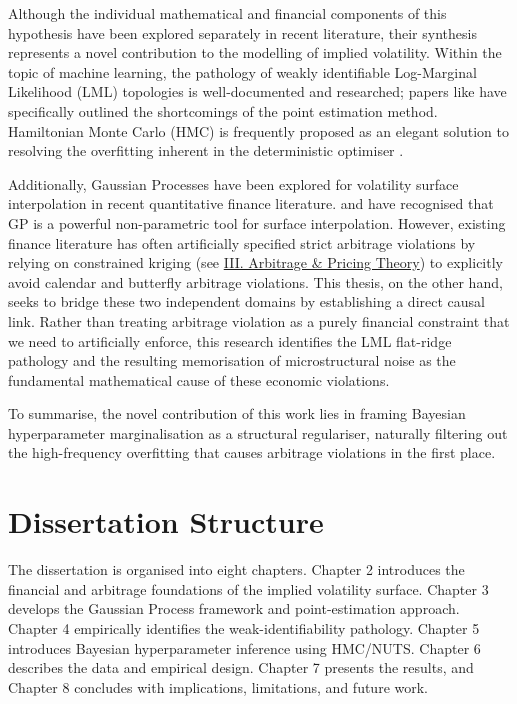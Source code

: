 \documentclass[12pt,oneside]{report}
\theoremstyle{definition}
\theoremstyle{remark}
\begin{document}
Although the individual mathematical and financial components of this hypothesis have been explored separately in recent literature, their synthesis represents a novel contribution to the modelling of implied volatility. Within the topic of machine learning, the pathology of weakly identifiable Log-Marginal Likelihood (LML) topologies is well-documented and researched; papers like \citet{titsias_nd} have specifically outlined the shortcomings of the point estimation method. Hamiltonian Monte Carlo (HMC) is frequently proposed as an elegant solution to resolving the overfitting inherent in the deterministic optimiser \cite{neal2011mcmc}.

Additionally, Gaussian Processes have been explored for volatility surface interpolation in recent quantitative finance literature. \citet{cousin2021gp} and \citet{chataigner2021beyond} have recognised that GP is a powerful non-parametric tool for surface interpolation. However, existing finance literature has often artificially specified strict arbitrage violations by relying on constrained kriging (see \hyperref[sec:glossary_arbitrage_pricing_theory]{III. Arbitrage \& Pricing Theory}) to explicitly avoid calendar and butterfly arbitrage violations. This thesis, on the other hand, seeks to bridge these two independent domains by establishing a direct causal link. Rather than treating arbitrage violation as a purely financial constraint that we need to artificially enforce, this research identifies the LML flat-ridge pathology and the resulting memorisation of microstructural noise as the fundamental mathematical cause of these economic violations.

To summarise, the novel contribution of this work lies in framing Bayesian hyperparameter marginalisation as a structural regulariser, naturally filtering out the high-frequency overfitting that causes arbitrage violations in the first place. 


\section{Dissertation Structure}
The dissertation is organised into eight chapters. Chapter 2 introduces the financial and arbitrage foundations of the implied volatility surface. Chapter 3 develops the Gaussian Process framework and point-estimation approach. Chapter 4 empirically identifies the weak-identifiability pathology. Chapter 5 introduces Bayesian hyperparameter inference using HMC/NUTS. Chapter 6 describes the data and empirical design. Chapter 7 presents the results, and Chapter 8 concludes with implications, limitations, and future work.
\end{document}
